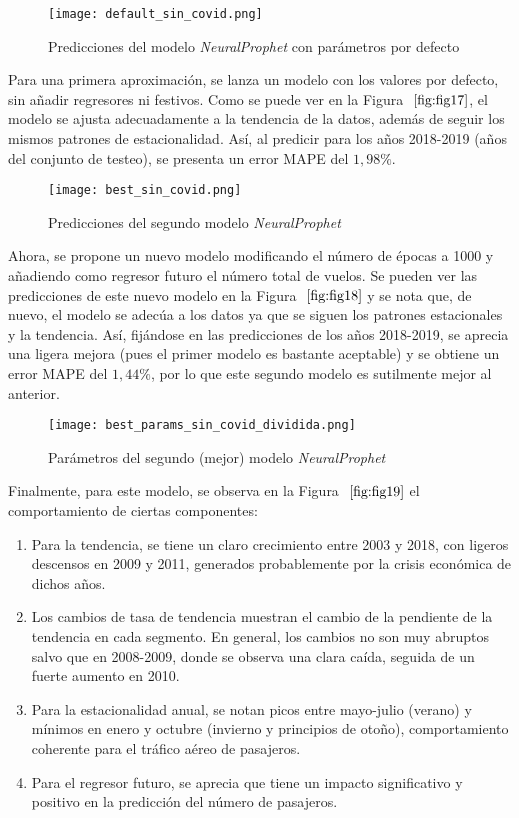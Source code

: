 \documentclass[12pt,twoside]{article}
\begin{document}
\begin{figure}[h]
    \centering
    \texttt{[image: default\_sin\_covid.png]}
    \caption{Predicciones del modelo \textit{NeuralProphet} con parámetros por defecto} 
    \label{fig:fig17}
\end{figure}

Para una primera aproximación, se lanza un modelo con los valores por defecto, sin añadir regresores ni festivos. Como se puede ver en la Figura $~\ref{fig:fig17}$, el modelo se ajusta adecuadamente a la tendencia de la datos, además de seguir los mismos patrones de estacionalidad. Así, al predicir para los años 2018-2019 (años del conjunto de testeo), se presenta un error MAPE del $1,98\%$.

\begin{figure}[h]
    \centering
    \texttt{[image: best\_sin\_covid.png]}
    \caption{Predicciones del segundo modelo \textit{NeuralProphet}} 
    \label{fig:fig18}
\end{figure}

Ahora, se propone un nuevo modelo modificando el número de épocas a 1000 y añadiendo como regresor futuro el número total de vuelos. Se pueden ver las predicciones de este nuevo modelo en la Figura $~\ref{fig:fig18}$ y se nota que, de nuevo, el modelo se adecúa a los datos ya que se siguen los patrones estacionales y la tendencia. Así, fijándose en las predicciones de los años 2018-2019, se aprecia una ligera mejora (pues el primer modelo es bastante aceptable) y se obtiene un error MAPE del $1,44\%$, por lo que este segundo modelo es sutilmente mejor al anterior.

\begin{figure}[h]
    \centering
    \texttt{[image: best\_params\_sin\_covid\_dividida.png]}
    \caption{Parámetros del segundo (mejor) modelo \textit{NeuralProphet}} 
    \label{fig:fig19}
\end{figure}

Finalmente, para este modelo, se observa en la Figura $~\ref{fig:fig19}$ el comportamiento de ciertas componentes:

\begin{enumerate}
    \item Para la tendencia, se tiene un claro crecimiento entre 2003 y 2018, con ligeros descensos en 2009 y 2011, generados probablemente por la crisis económica de dichos años.
    \item Los cambios de tasa de tendencia muestran el cambio de la pendiente de la tendencia en cada segmento. En general, los cambios no son muy abruptos salvo que en 2008-2009, donde se observa una clara caída, seguida de un fuerte aumento en 2010. 
    \item Para la estacionalidad anual, se notan picos entre mayo-julio (verano) y mínimos en enero y octubre (invierno y principios de otoño), comportamiento coherente para el tráfico aéreo de pasajeros. 
    \item Para el regresor futuro, se aprecia que tiene un impacto significativo y positivo en la predicción del número de pasajeros.
\end{enumerate}
\end{document}
